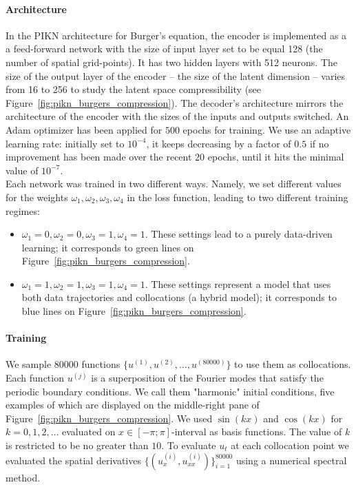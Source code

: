 \paragraph{Architecture} 
In the PIKN architecture for Burger's equation, the encoder is implemented as a a feed-forward network with the size of input layer set to be equal 128 (the number of spatial grid-points). It has two hidden layers with 512 neurons. The size of the output layer of the encoder -- the size of the latent dimension -- varies from 16 to 256 to study the latent space compressibility (see Figure~\ref{fig:pikn_burgers_compression}). The decoder's architecture mirrors the architecture of the encoder with the sizes of the inputs and outputs switched. An Adam optimizer has been applied for $500$ epochs for training. We use an adaptive learning rate: initially set to $10^{-4}$, it keeps decreasing by a factor of $0.5$ if no improvement has been made over the recent $20$ epochs, until it hits the minimal value of $10^{-7}$. \\
Each network was trained in two different ways. Namely, we set different values for the weights $\omega_1, \omega_2, \omega_3, \omega_4$ in the loss function, leading to two different training regimes:
\begin{itemize}
    \item $\omega_1=0, \omega_2=0, \omega_3=1, \omega_4=1$. These settings lead to a purely data-driven learning; it corresponds to green lines on Figure~\ref{fig:pikn_burgers_compression}.
    \item $\omega_1=1, \omega_2=1, \omega_3=1, \omega_4=1$. These settings represent a model that uses both data trajectories and collocations (a hybrid model); it corresponds to blue lines on Figure~\ref{fig:pikn_burgers_compression}.
\end{itemize}

\paragraph{Training} 
We sample $80000$ functions $\{u^{(1)}, u^{(2)}, \dots, u^{(80000)}\}$ to use them as collocations. Each function $u^{(j)}$ is a superposition of the Fourier modes that satisfy the periodic boundary conditions. We call them "harmonic" initial conditions, five examples of which are displayed on the middle-right pane of Figure~\ref{fig:pikn_burgers_compression}. We used $\sin{(kx)}$ and $\cos{(kx)}$ for $k=0, 1, 2, \dots$ evaluated on $x \in [-\pi; \pi]$-interval as basis functions. The value of $k$ is restricted to be no greater than $10$. To evaluate $u_t$ at each collocation point we evaluated the spatial derivatives $\{(u_{x}^{(i)}, u_{xx}^{(i)})\}_{i=1}^{80000}$ using a numerical spectral method. 

